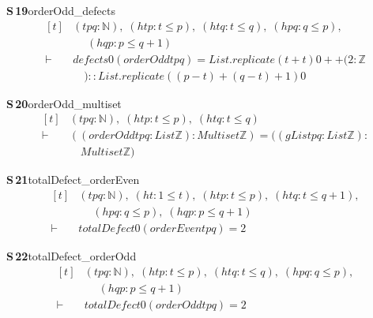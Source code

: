 \documentclass[conference]{IEEEtran}
\theoremstyle{definition}
\newcommand{\lean}[1]{\textsf{\footnotesize #1}}
\begin{document}
\noindent\textbf{S\,19}\quad\lean{orderOdd\_defects}
{\footnotesize\[ \begin{aligned}[t]
&(\mathit{t} \mathit{p} \mathit{q} : \mathbb{N} ),\; (\mathit{htp} : \mathit{t} \leq \mathit{p}),\; (\mathit{htq} : \mathit{t} \leq \mathit{q}),\; (\mathit{hpq} : \mathit{q} \leq \mathit{p}),\\
&\quad \; (\mathit{hqp} : \mathit{p} \leq \mathit{q} + 1)\\
\vdash\;&\mathit{defects} 0 (\mathit{orderOdd} \mathit{t} \mathit{p} \mathit{q}) = \mathit{List}.\mathit{replicate} (\mathit{t} + \mathit{t}) 0 ++ (2 : \mathbb{Z}\\
&\quad ) :: \mathit{List}.\mathit{replicate} ((\mathit{p} - \mathit{t}) + (\mathit{q} - \mathit{t}) + 1) 0
\end{aligned} \]}

\noindent\textbf{S\,20}\quad\lean{orderOdd\_multiset}
{\footnotesize\[ \begin{aligned}[t]
&(\mathit{t} \mathit{p} \mathit{q} : \mathbb{N} ),\; (\mathit{htp} : \mathit{t} \leq \mathit{p}),\; (\mathit{htq} : \mathit{t} \leq \mathit{q})\\
\vdash\;&((\mathit{orderOdd} \mathit{t} \mathit{p} \mathit{q} : \mathit{List} \mathbb{Z} ) : \mathit{Multiset} \mathbb{Z} ) = ((\mathit{gList} \mathit{p} \mathit{q} : \mathit{List} \mathbb{Z} ) :\\
&\quad \mathit{Multiset} \mathbb{Z} )
\end{aligned} \]}

\noindent\textbf{S\,21}\quad\lean{totalDefect\_orderEven}
{\footnotesize\[ \begin{aligned}[t]
&(\mathit{t} \mathit{p} \mathit{q} : \mathbb{N} ),\; (\mathit{ht} : 1 \leq \mathit{t}),\; (\mathit{htp} : \mathit{t} \leq \mathit{p}),\; (\mathit{htq} : \mathit{t} \leq \mathit{q} + 1),\\
&\quad \; (\mathit{hpq} : \mathit{q} \leq \mathit{p}),\; (\mathit{hqp} : \mathit{p} \leq \mathit{q} + 1)\\
\vdash\;&\mathit{totalDefect} 0 (\mathit{orderEven} \mathit{t} \mathit{p} \mathit{q}) = 2
\end{aligned} \]}

\noindent\textbf{S\,22}\quad\lean{totalDefect\_orderOdd}
{\footnotesize\[ \begin{aligned}[t]
&(\mathit{t} \mathit{p} \mathit{q} : \mathbb{N} ),\; (\mathit{htp} : \mathit{t} \leq \mathit{p}),\; (\mathit{htq} : \mathit{t} \leq \mathit{q}),\; (\mathit{hpq} : \mathit{q} \leq \mathit{p}),\\
&\quad \; (\mathit{hqp} : \mathit{p} \leq \mathit{q} + 1)\\
\vdash\;&\mathit{totalDefect} 0 (\mathit{orderOdd} \mathit{t} \mathit{p} \mathit{q}) = 2
\end{aligned} \]}
\end{document}
